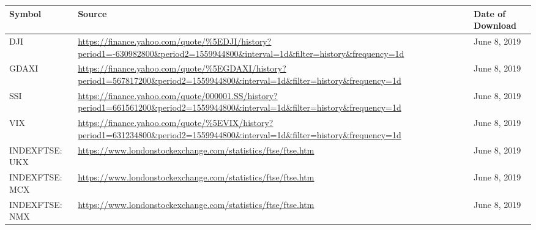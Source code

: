 \documentclass[11pt, a4paper]{article}
\begin{document}
        \begin{table}[H]
    \centering
        \begin{tabular}{p{3.0cm} p{10.0cm}l}
        \hline
        \textbf{Symbol}                                                             & \textbf{Source}                                                                                                                                              & \textbf{Date of Download} \\ \hline
       
        DJI                                                                         & \url{https://finance.yahoo.com/quote/\%5EDJI/history?period1=-630982800\&period2=1559944800\&interval=1d\&filter=history\&frequency=1d}     & June 8, 2019              \\
        GDAXI                                                                       & \url{https://finance.yahoo.com/quote/\%5EGDAXI/history?period1=567817200\&period2=1559944800\&interval=1d\&filter=history\&frequency=1d}    & June 8, 2019              \\
        SSI                                                                         & \url{https://finance.yahoo.com/quote/000001.SS/history?period1=661561200\&period2=1559944800\&interval=1d\&filter=history\&frequency=1d}    & June 8, 2019              \\
        VIX                                                                         & \url{https://finance.yahoo.com/quote/\%5EVIX/history?period1=631234800\&period2=1559944800\&interval=1d\&filter=history\&frequency=1d}      & June 8, 2019              \\
        INDEXFTSE: UKX                                                              & \url{https://www.londonstockexchange.com/statistics/ftse/ftse.htm}                                                                          & June 8, 2019              \\
        INDEXFTSE: MCX                                                              & \url{https://www.londonstockexchange.com/statistics/ftse/ftse.htm}                                                                          & June 8, 2019              \\
        INDEXFTSE: NMX                                                              & \url{https://www.londonstockexchange.com/statistics/ftse/ftse.htm}                                                                          & June 8, 2019              \\

\end{tabular}
\end{table}
\end{document}
